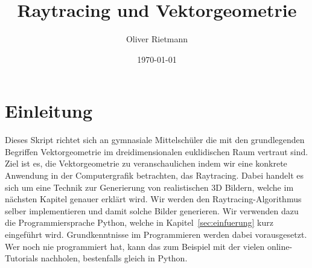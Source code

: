 \documentclass[12pt,a4paper]{article}
\title{Raytracing und Vektorgeometrie}
\author{Oliver Rietmann}
\date{\today}
\theoremstyle{definition}
\theoremstyle{definition}
\begin{document}
\maketitle
\tableofcontents

\section*{Einleitung}
Dieses Skript richtet sich an gymnasiale Mittelschüler die mit den grundlegenden Begriffen Vektorgeometrie im dreidimensionalen euklidischen Raum vertraut sind.
Ziel ist es, die Vektorgeometrie zu veranschaulichen indem wir eine konkrete Anwendung in der Computergrafik betrachten, das Raytracing.
Dabei handelt es sich um eine Technik zur Generierung von realistischen 3D Bildern, welche im nächsten Kapitel genauer erklärt wird.
Wir werden den Raytracing-Algorithmus selber implementieren und damit solche Bilder generieren.
Wir verwenden dazu die Programmiersprache Python, welche in Kapitel~\ref{sec:einfuerung} kurz eingeführt wird.
Grundkenntnisse im Programmieren werden dabei vorausgesetzt.
Wer noch nie programmiert hat, kann das zum Beispiel mit der vielen online-Tutorials nachholen, bestenfalls gleich in Python.
\end{document}

